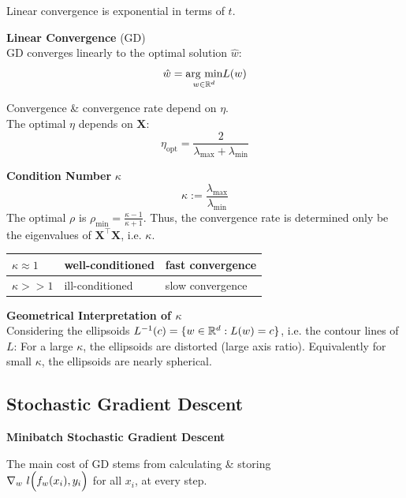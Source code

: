 {\footnotesize
    \remark Linear convergence is exponential in terms of $t$.
}

\theorem \textbf{Linear Convergence} (GD)\\
GD converges linearly to the optimal solution $\hat{w}$:
$$
    \hat{w} = \underset{w\in\mathbb{R}^d}{\text{arg min}} L(w)
$$

Convergence \& convergence rate depend on $\eta$.\\
The optimal $\eta$ depends on $\mathbf{X}$:
$$
    \eta_\text{opt} = \frac{2}{\lambda_\text{max} + \lambda_\text{min}}
$$

 \textbf{Condition Number} $\kappa$
$$
    \kappa := \frac{\lambda_\text{max}}{\lambda_\text{min}}
$$
The optimal $\rho$ is $\rho_\text{min}=\frac{\kappa-1}{\kappa+1}$. Thus, the convergence rate is determined only be the eigenvalues of $\mathbf{X}^\top \mathbf{X}$, i.e. $\kappa$.

\begin{center}
    \begin{tabular}{l|l|l}
        $\kappa \approx 1$ & well-conditioned & fast convergence \\
        \hline
        $\kappa >> 1$ & ill-conditioned & slow convergence \\
    \end{tabular}
\end{center}

{\footnotesize
    \remark \textbf{Geometrical Interpretation of $\kappa$}\\
    Considering the ellipsoids $L^{-1}(c) = \{w \in \mathbb{R}^d: L(w) = c\}$, i.e. the contour lines of $L$: For a large $\kappa$, the ellipsoids are distorted (large axis ratio). Equivalently for small $\kappa$, the ellipsoids are nearly spherical.\\ 
}

\newpage
\subsection{Stochastic Gradient Descent}

\method \textbf{Minibatch Stochastic Gradient Descent}

The main cost of GD stems from calculating \& storing\\
$\nabla_w\ l\Bigl(f_w(x_i), y_i\Bigr)$ for all $x_i$, at every step.

